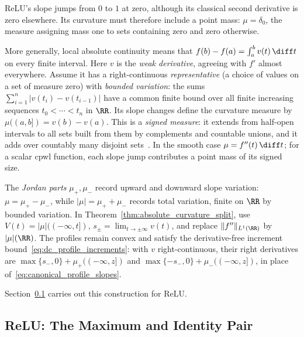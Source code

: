 \begin{remark}\label{rem:bv_extension}
ReLU's slope jumps from $0$ to $1$ at zero, although its classical second derivative is zero elsewhere. Its curvature must therefore include a point mass: $\mu=\delta_0$, the measure assigning mass one to sets containing zero and zero otherwise.

More generally, local absolute continuity means that $f(b)-f(a)=\int_a^b v(t)\,\diff t$ on every finite interval. Here $v$ is the \emph{weak derivative}, agreeing with $f'$ almost everywhere. Assume it has a right-continuous \emph{representative} (a choice of values on a set of measure zero) with \emph{bounded variation}: the sums $\sum_{i=1}^n|v(t_i)-v(t_{i-1})|$ have a common finite bound over all finite increasing sequences $t_0<\cdots<t_n$ in $\RR$. Its slope changes define the curvature measure by $\mu((a,b])=v(b)-v(a)$. This is a \emph{signed measure}: it extends from half-open intervals to all sets built from them by complements and countable unions, and it adds over countably many disjoint sets~\parencite[Sections~3.A--3.C]{Hunter2014PDE}. In the smooth case $\mu=f''(t)\,\diff t$; for a scalar \ac{cpwl} function, each slope jump contributes a point mass of its signed size.

The \emph{Jordan parts} $\mu_+,\mu_-$ record upward and downward slope variation: $\mu=\mu_+-\mu_-$, while $|\mu|=\mu_++\mu_-$ records total variation, finite on $\RR$ by bounded variation. In Theorem~\ref{thm:absolute_curvature_split}, use $V(t)=|\mu|(({-\infty},t])$, $s_\pm=\lim_{t\to\pm\infty}v(t)$, and replace $\|f''\|_{L^1(\RR)}$ by $|\mu|(\RR)$. The profiles remain convex and satisfy the derivative-free increment bound~\eqref{eq:dc_profile_increments}: with $v$ right-continuous, their right derivatives are $\max\{s_-,0\}+\mu_+((-\infty,z])$ and $\max\{-s_-,0\}+\mu_-((-\infty,z])$, in place of~\eqref{eq:canonical_profile_slopes}.

Section~\ref{sec:dc_splitting_relu} carries out this construction for ReLU.
\end{remark}

\subsection{ReLU: The Maximum and Identity Pair}\label{sec:dc_splitting_relu}


